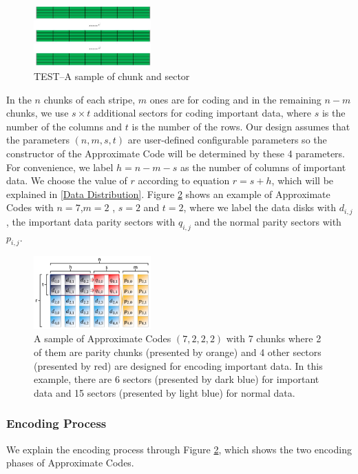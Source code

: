 \documentclass[conference]{IEEEtran}
\begin{document}
\begin{figure}[ht]
\centering
\includegraphics[width=0.4\textwidth]{photo/TEST-chunk-sector.JPG}
\caption{TEST--A sample of chunk and sector}
\label{TEST-chunk-sector}
\end{figure}

In the $n$ chunks of each stripe, $m$ ones are for coding and in the remaining $n-m$ chunks, we use $s \times t$ additional sectors for coding important data, where $s$ is the number of the columns and $t$ is the number of the rows.
Our design assumes that the parameters  $(n, m, s,t)$ are user-defined configurable parameters so the constructor of the Approximate Code will be determined by these 4 parameters.
For convenience, we label $h=n-m-s$ as the number of columns of important data.
We choose the value of $r$ according to equation $r=s+h$, which will be explained in \ref{Data Distribution}.
Figure \ref{apcode-7222-v2} shows an example of Approximate Codes with $n = 7$,$m = 2$ , $s=2$ and $t = 2$, where we label the data disks with $d_{i,j}$, the important data parity sectors with $q_{i,j}$ and the normal parity sectors with $p_{i,j}$. 

\begin{figure}[t]
\centering
\includegraphics[width=0.4\textwidth]{photo/apcode-7222-v2.PDF}
\caption{A sample of Approximate Codes $(7,2,2,2)$ with 7 chunks where 2 of them are parity chunks (presented by orange) and 4 other sectors (presented by red) are designed for encoding important data. In this example, there are 6 sectors (presented by dark blue) for important data and 15 sectors (presented by light blue) for normal data.}
\label{apcode-7222-v2}
\end{figure}

\subsubsection{Encoding Process}
We explain the encoding process through Figure \ref{apcode-7222-v2}, which shows the two encoding phases of Approximate Codes. 
\end{document}
